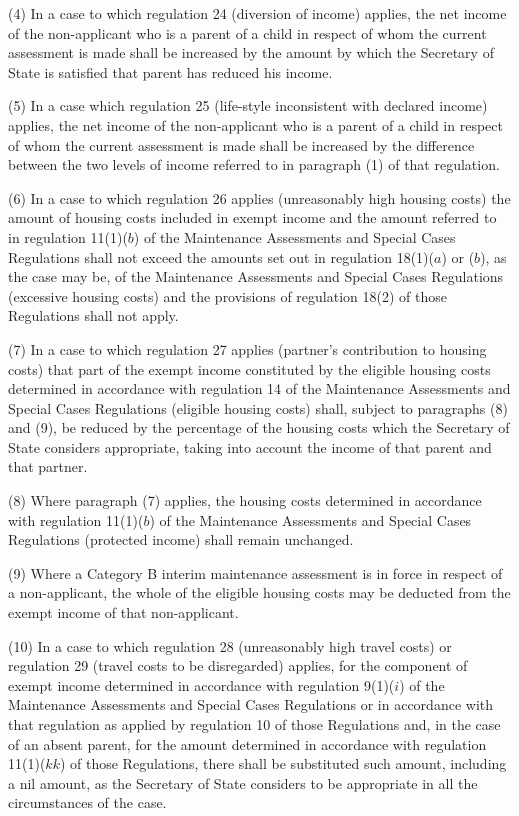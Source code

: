 \documentclass[a4paper]{article}
\begin{document}
(4) In a case to which regulation 24 (diversion of income) applies, the net income of the non-applicant who is a parent of a child in respect of whom the current assessment is made shall be increased by the amount by which the Secretary of State is satisfied that parent has reduced his income.

(5) In a case which regulation 25 (life-style inconsistent with declared income) applies, the net income of the non-applicant who is a parent of a child in respect of whom the current assessment is made shall be increased by the difference between the two levels of income referred to in paragraph (1) of that regulation.

(6) In a case to which regulation 26 applies (unreasonably high housing costs) the amount of housing costs included in exempt income and the amount referred to in regulation 11(1)($b$) of the Maintenance Assessments and Special Cases Regulations shall not exceed the amounts set out in regulation 18(1)($a$) or ($b$), as the case may be, of the Maintenance Assessments and Special Cases Regulations (excessive housing costs) and the provisions of regulation 18(2) of those Regulations shall not apply.

(7) In a case to which regulation 27 applies (partner’s contribution to housing costs) that part of the exempt income constituted by the eligible housing costs determined in accordance with regulation 14 of the Maintenance Assessments and Special Cases Regulations (eligible housing costs) shall, subject to paragraphs (8) and (9), be reduced by the percentage of the housing costs which the Secretary of State considers appropriate, taking into account the income of that parent and that partner.

(8) Where paragraph (7) applies, the housing costs determined in accordance with regulation 11(1)($b$) of the Maintenance Assessments and Special Cases Regulations (protected income) shall remain unchanged.

(9) Where a Category B interim maintenance assessment is in force in respect of a non-applicant, the whole of the eligible housing costs may be deducted from the exempt income of that non-applicant.

(10) In a case to which regulation 28 (unreasonably high travel costs) or regulation 29 (travel costs to be disregarded) applies, for the component of exempt income determined in accordance with regulation 9(1)($i$) of the Maintenance Assessments and Special Cases Regulations or in accordance with that regulation as applied by regulation 10 of those Regulations and, in the case of an absent parent, for the amount determined in accordance with regulation 11(1)($kk$) of those Regulations, there shall be substituted such amount, including a nil amount, as the Secretary of State considers to be appropriate in all the circumstances of the case.
\end{document}
